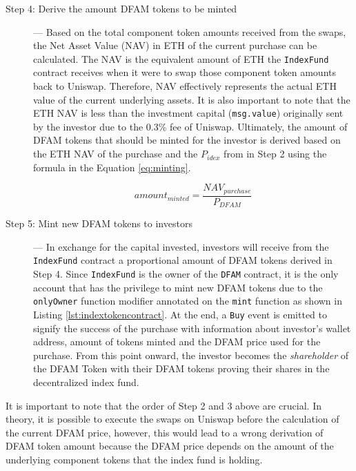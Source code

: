 \begin{description}
  \item[Step 4: Derive the amount DFAM tokens to be minted] \label{step:step4purchase} --- Based on the total component token amounts received from the swaps, the Net Asset Value (NAV) in ETH of the current purchase can be calculated. The NAV is the equivalent amount of ETH the \texttt{IndexFund} contract receives when it were to swap those component token amounts back to Uniswap. Therefore, NAV effectively represents the actual ETH value of the current underlying assets. It is also important to note that the ETH NAV is less than the investment capital (\texttt{msg.value}) originally sent by the investor due to the 0.3\% fee of Uniswap. Ultimately, the amount of DFAM tokens that should be minted for the investor is derived based on the ETH NAV of the purchase and the $P_{idex}$ from in Step 2 using the formula in the Equation \ref{eq:minting}.

\begin{equation} \label{eq:minting}
  amount_{minted} = \frac{NAV_{purchase} }{P_{DFAM}} 
\end{equation}
  
  \item[Step 5: Mint new DFAM tokens to investors] --- In exchange for the capital invested, investors will receive from the \texttt{IndexFund} contract a proportional amount of DFAM tokens derived in Step 4. Since \texttt{IndexFund} is the owner of the \texttt{DFAM} contract, it is the only account that has the privilege to mint new DFAM tokens due to the \texttt{onlyOwner} function modifier annotated on the \texttt{mint} function as shown in Listing \ref{lst:indextokencontract}. At the end, a \texttt{Buy} event is emitted to signify the success of the purchase with information about investor's wallet address, amount of tokens minted and the DFAM price used for the purchase. From this point onward, the investor becomes the \textit{shareholder} of the DFAM Token with their DFAM tokens proving their shares in the decentralized index fund.

\end{description}


It is important to note that the order of Step 2 and 3 above are crucial. In theory, it is possible to execute the swaps on Uniswap before the calculation of the current DFAM price, however, this would lead to a wrong derivation of DFAM token amount because the DFAM price depends on the amount of the underlying component tokens that the index fund is holding. 

